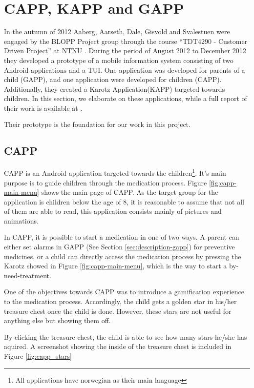 \section{CAPP, KAPP and GAPP}
\label{sec:cappgappkapp}
In the autumn of 2012 Aaberg, Aarseth, Dale, Gisvold and Svalestuen were engaged by the BLOPP Project group through the course ``TDT4290 - Customer Driven Project'' at NTNU . During the period of August 2012 to December 2012 they developed a prototype of a mobile information system consisting of two Android applications and a TUI. One application was developed for parents of a child (GAPP), and one application were developed for children (CAPP). Additionally, they created a Karotz Application(KAPP) targeted towards children. In this section, we elaborate on these applications, while a full report of their work is available at \cite{CustomerDriven}. %

Their prototype is the foundation for our work in this project. %

\subsection{CAPP}
\label{sec:description-capp}
CAPP is an Android application targeted towards the children\footnote{All applications have norwegian as their main language}. It's main purpose is to guide children through the medication process. Figure \ref{fig:capp-main-menu} shows the main page of CAPP.  
As the target group for the application is children below the age of 8, it is reasonable to assume that not all of them are able to read, this application consists mainly of pictures and animations.


In CAPP, it is possible to start a medication in one of two ways. A parent can either set alarms in GAPP (See Section \ref{sec:description-gapp}) for preventive medicines, or a child can directly access the medication process by pressing the Karotz showed in Figure \ref{fig:capp-main-menu}, which is the way to start a by-need-treatment. 


One of the objectives towards CAPP was to introduce a gamification experience to the medication process. Accordingly, the child gets a golden star in his/her treasure chest once the child is done. However, these stars are not useful for anything else but showing them off.
  

By clicking the treasure chest, the child is able to see how many stars he/she has aquired. A screenshot showing the inside of the treasure chest is included in Figure \ref{fig:capp_stars} 


